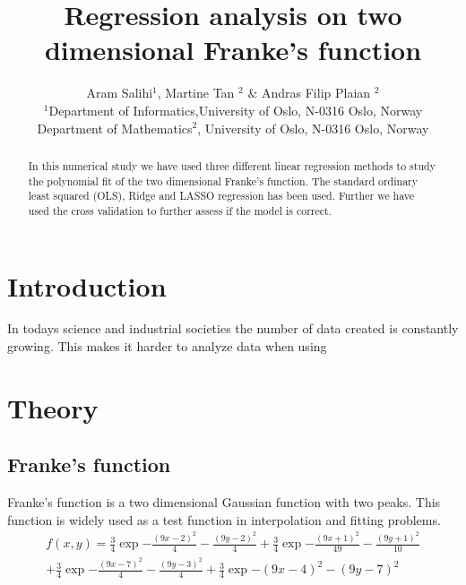 \documentclass[a4paper, 10pt]{article}
\title{Regression analysis on two dimensional Franke's function}
\author{Aram Salihi$^1$, Martine Tan $^2$ \& Andras Filip Plaian $^2$
\\
  \small $^1$Department of Informatics,University of Oslo, N-0316 Oslo, Norway\\
\small Department of Mathematics$^2$, University of Oslo, N-0316 Oslo, Norway}
\begin{document}
\maketitle
\begin{abstract}
In this numerical study we have used three different linear regression methods to study the polynomial fit of the two dimensional Franke's function. The standard ordinary least squared (OLS), Ridge and LASSO regression has been used. Further we have used the cross validation to further assess if the model is correct.

\end{abstract}
\tableofcontents
\section{Introduction} In todays science and industrial societies the number of data created is constantly growing. This makes it harder to analyze data when using
\section{Theory}
\subsection{Franke's function} Franke's function is a two dimensional Gaussian function with two peaks. This function is widely used as a test function in interpolation and fitting problems.
\begin{align}
  f(x,y) = \frac{3}{4}\exp{-\frac{(9x-2)^2}{4} - \frac{(9y-2)^2}{4}}
+
  \frac{3}{4}\exp{-\frac{(9x+1)^2}{49} - \frac{(9y+1)^2}{10}}
  \\
+  \frac{3}{4}\exp{-\frac{(9x-7)^2}{4} - \frac{(9y-3)^2}{4}}
+
  \frac{3}{4}\exp{-(9x-4)^2 - (9y-7)^2}
\end{align}
\end{document}
